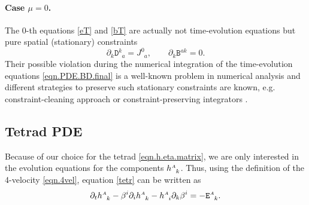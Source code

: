 \documentclass[
10pt, %
a4paper, %
oneside, %
headinclude,footinclude, %
BCOR5mm, %
]{scrartcl}
\newcommand{\sA}{\mathsmaller A}
\newcommand{\pd}[1]{\partial_{#1}}
\newcommand{\tetrsymbol}{h}
\newcommand{\tetr}[2]{\tetrsymbol^{#1}_{\phantom{#1}#2}}
\newcommand{\aD}[2]{\mathcal{D}_{\phantom{#2}#1}^{#2}}	%
\newcommand{\Dfin}[2]{\mathtt{D}_{\phantom{#2}#1}^{#2}}	%
\newcommand{\Efin}[2]{\mathtt{E}^{#1}_{\phantom{#1}#2}}	%
\newcommand{\Bfin}[2]{\mathtt{B}^{#1#2}}	%
\newcommand{\aU}{\mathcal{U}}%
\newcommand{\NC}[2]{J^{#2}_{\phantom{#2}#1}}
\begin{document}
\paragraph{Case $ \mu = 0 $.} 

The $ 0 $-th equations \eqref{eT} and \eqref{bT} are actually not time-evolution equations but  
pure spatial (stationary) constraints
\begin{equation}\label{eqn.div.constr}
	\pd{k} \Dfin{a}{k} = \NC{a}{0}, 
	\qquad
	\pd{k} \Bfin{a}{k} = 0.
\end{equation}
Their possible violation during the numerical integration of the time-evolution equations 
\eqref{eqn.PDE.BD.final} is a well-known problem in numerical analysis and different strategies to 
preserve such stationary constraints   
are known, e.g. constraint-cleaning approach \cite{Munz2000,Dedneretal,Dumbser2019} or 
constraint-preserving 
integrators 
\cite{Olivares2022,SIGPR2021}.


\subsection{Tetrad PDE}

Because of our choice for the tetrad \eqref{eqn.h.eta.matrix}, we are only interested in the  
evolution equations for the components $ \tetr{\sA}{k} $. Thus, using the definition of 
the 4-velocity \eqref{eqn.4vel}, equation \eqref{tetr} can be written as
\begin{equation}\label{eqn.tetr.3+1}
	\pd{t} \tetr{\sA}{k} - \beta^i \pd{i} \tetr{\sA}{k} - \tetr{\sA}{i} \pd{k} \beta^i 
	= 
	-\Efin{\sA}{k}.
\end{equation}
\end{document}
